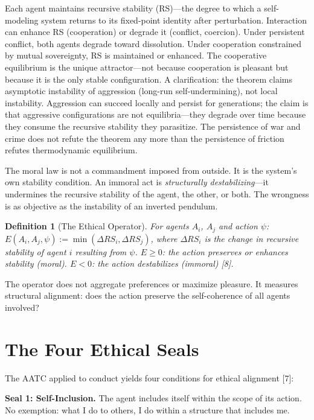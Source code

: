 \documentclass[12pt, letterpaper]{article}
\newtheorem{definition}{Definition}[section]
\begin{document}
Each agent maintains recursive stability (RS)---the degree to which a self-modeling system returns to its fixed-point identity after perturbation. Interaction can enhance RS (cooperation) or degrade it (conflict, coercion). Under persistent conflict, both agents degrade toward dissolution. Under cooperation constrained by mutual sovereignty, RS is maintained or enhanced. The cooperative equilibrium is the unique attractor---not because cooperation is pleasant but because it is the only stable configuration. A clarification: the theorem claims asymptotic instability of aggression (long-run self-undermining), not local instability. Aggression can succeed locally and persist for generations; the claim is that aggressive configurations are not equilibria---they degrade over time because they consume the recursive stability they parasitize. The persistence of war and crime does not refute the theorem any more than the persistence of friction refutes thermodynamic equilibrium.

The moral law is not a commandment imposed from outside. It is the system's own stability condition. An immoral act is \textit{structurally destabilizing}---it undermines the recursive stability of the agent, the other, or both. The wrongness is as objective as the instability of an inverted pendulum.

\begin{definition}[The Ethical Operator]
\label{def:operator}
For agents $A_i$, $A_j$ and action $\psi$: $E(A_i, A_j, \psi) := \min(\Delta RS_i, \Delta RS_j)$, where $\Delta RS_i$ is the change in recursive stability of agent $i$ resulting from $\psi$. $E \geq 0$: the action preserves or enhances stability (moral). $E < 0$: the action destabilizes (immoral) [8].
\end{definition}

The operator does not aggregate preferences or maximize pleasure. It measures structural alignment: does the action preserve the self-coherence of all agents involved?

\section{The Four Ethical Seals}

The AATC applied to conduct yields four conditions for ethical alignment [7]:

\textbf{Seal 1: Self-Inclusion.} The agent includes itself within the scope of its action. No exemption: what I do to others, I do within a structure that includes me.
\end{document}
